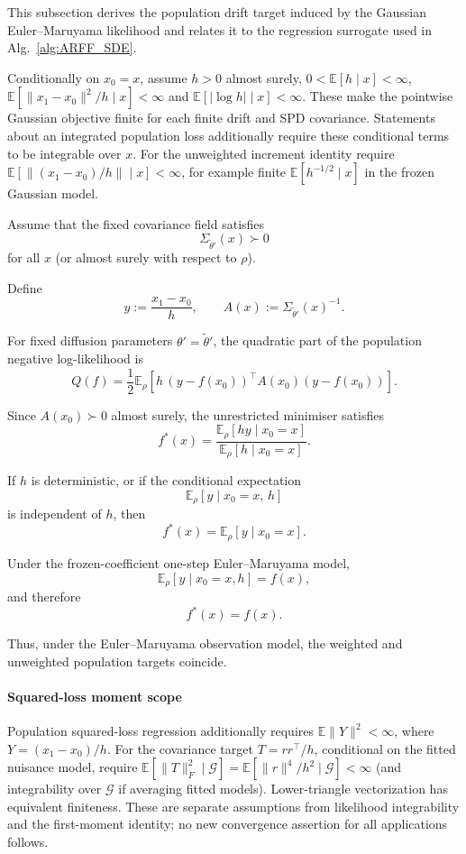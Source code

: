 \documentclass{article}
\newcommand{\E}{\mathbb{E}}
\def\E{\mathbb{E}}
\begin{document}
{\color{black}
This subsection derives the population drift target induced by the
Gaussian Euler--Maruyama likelihood and relates it to the regression
surrogate used in Alg.~\ref{alg:ARFF_SDE}.

Conditionally on $x_0=x$, assume $h>0$ almost surely, $0<\E[h\mid x]<\infty$, $\E[\|x_1-x_0\|^2/h\mid x]<\infty$ and $\E[|\log h|\mid x]<\infty$. These make the pointwise Gaussian objective finite for each finite drift and SPD covariance. Statements about an integrated population loss additionally require these conditional terms to be integrable over $x$. For the unweighted increment identity require $\E[\|(x_1-x_0)/h\|\mid x]<\infty$, for example finite $\E[h^{-1/2}\mid x]$ in the frozen Gaussian model.

Assume that the fixed covariance field satisfies
\[
\Sigma_{\tilde\theta'}(x)\succ0
\]
for all $x$ (or almost surely with respect to $\rho$).

Define
\[
y:=\frac{x_1-x_0}{h},
\qquad
A(x):=\Sigma_{\tilde\theta'}(x)^{-1}.
\]

For fixed diffusion parameters $\theta'=\tilde\theta'$, the quadratic part
of the population negative log-likelihood is
\[
Q(f)
=
\frac12
\E_{\rho}\!\left[
h\,(y-f(x_0))^\top
A(x_0)
(y-f(x_0))
\right].
\]

Since $A(x_0)\succ0$ almost surely, the unrestricted minimiser satisfies
\[
f^*(x)
=
\frac{\E_{\rho}[hy\mid x_0=x]}
     {\E_{\rho}[h\mid x_0=x]}.
\]

If \(h\) is deterministic, or if the conditional expectation
\[
\E_{\rho}[y\mid x_0=x,\,h]
\]
is independent of \(h\), then
\[
f^*(x)=\E_{\rho}[y\mid x_0=x].
\]

Under the frozen-coefficient one-step Euler--Maruyama model,
\[
\E_{\rho}[y\mid x_0=x,h]=f(x),
\]
and therefore
\[
f^*(x)=f(x).
\]

Thus, under the Euler--Maruyama observation model, the weighted and
unweighted population targets coincide.
}



\paragraph{Squared-loss moment scope}
Population squared-loss regression additionally requires $\E\|Y\|^2<\infty$, where $Y=(x_1-x_0)/h$. For the covariance target $T=rr^\top/h$, conditional on the fitted nuisance model, require $\E[\|T\|_F^2\mid\mathcal G]=\E[\|r\|^4/h^2\mid\mathcal G]<\infty$ (and integrability over $\mathcal G$ if averaging fitted models). Lower-triangle vectorization has equivalent finiteness. These are separate assumptions from likelihood integrability and the first-moment identity; no new convergence assertion for all applications follows.
\end{document}
